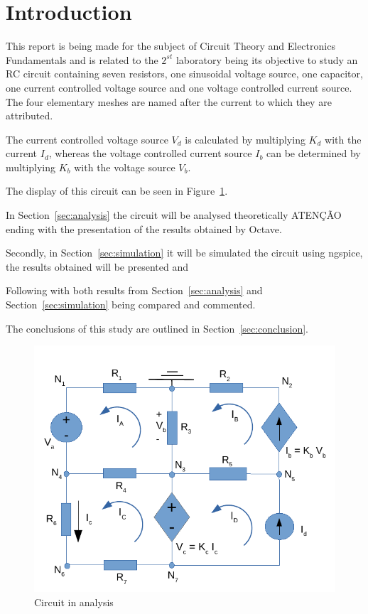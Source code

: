\section{Introduction}
\label{sec:introduction}


\hspace{0,5cm} This report is being made for the subject of Circuit Theory and Electronics Fundamentals and is related to the $2^{st}$ laboratory being its objective to study an RC circuit containing seven resistors, one sinusoidal voltage source, one capacitor, one current controlled voltage source and one voltage controlled current source. The four elementary meshes are named after the current to which they are attributed.

The current controlled voltage source $V_d$ is calculated by multiplying $K_d$ with the current $I_d$, whereas the voltage controlled current source $I_b$ can be determined by multiplying $K_b$ with the voltage source $V_b$.

The display of this circuit can be seen in Figure~\ref{fig:circuito}.

In Section~\ref{sec:analysis} the circuit will be analysed theoretically ATENÇÃO ending with the presentation of the results obtained by Octave.

Secondly, in Section~\ref{sec:simulation} it will be simulated the circuit using ngspice, the results obtained will be presented and 

Following with both results from Section~\ref{sec:analysis} and Section~\ref{sec:simulation} being compared and commented.

The conclusions of this study are outlined in Section~\ref{sec:conclusion}.

\begin{figure}[H] \centering
\includegraphics[width=1\linewidth]{circuito.pdf}
\caption{Circuit in analysis}
\label{fig:circuito}
\end{figure}

